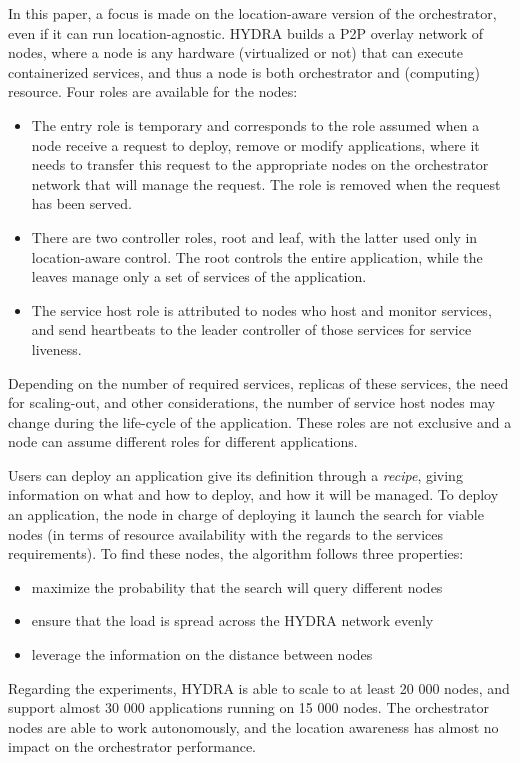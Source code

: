 In this paper, a focus is made on the location-aware version of the
orchestrator, even if it can run location-agnostic.
%
HYDRA builds a \acrshort{P2P} overlay network of nodes, where a node
is any hardware (virtualized or not) that can execute containerized
services, and thus a node is both orchestrator and (computing)
resource.
%
Four roles are available for the nodes:
\begin{itemize}
\item The entry role is temporary and corresponds to the role assumed
  when a node receive a request to deploy, remove or modify
  applications, where it needs to transfer this request to the
  appropriate nodes on the orchestrator network that will manage the
  request. The role is removed when the request has been served.
\item There are two controller roles, root and leaf, with the latter
  used only in location-aware control. The root controls the entire
  application, while the leaves manage only a set of services of the
  application.
\item The service host role is attributed to nodes who host and
  monitor services, and send heartbeats to the leader controller of
  those services for service liveness.
\end{itemize}

Depending on the number of required services, replicas of these
services, the need for scaling-out, and other considerations, the
number of service host nodes may change during the life-cycle of the
application.
%
These roles are not exclusive and a node can assume different roles
for different applications.

Users can deploy an application give its definition through a
\emph{recipe}, giving information on what and how to deploy, and how
it will be managed.
%
To deploy an application, the node in charge of deploying it launch
the search for viable nodes (in terms of resource availability with
the regards to the services requirements).
%
To find these nodes, the algorithm follows three properties:
\begin{itemize}
\item maximize the probability that the search will query different nodes
\item ensure that the load is spread across the HYDRA network evenly
\item leverage the information on the distance between nodes
\end{itemize}

Regarding the experiments, HYDRA is able to scale to at least 20 000
nodes, and support almost 30 000 applications running on 15 000 nodes.
%
The orchestrator nodes are able to work autonomously, and the location
awareness has almost no impact on the orchestrator performance.

